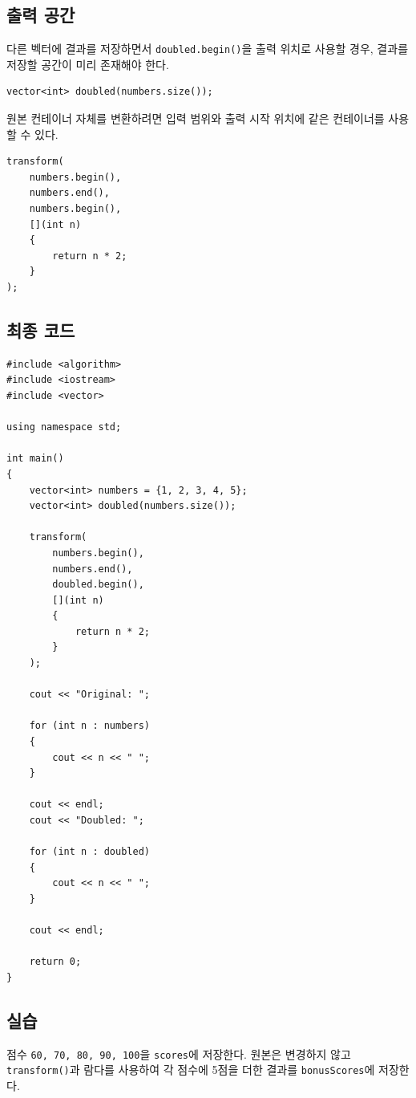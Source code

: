 \documentclass[11pt,a4paper]{article}
\begin{document}
\subsection{출력 공간}
다른 벡터에 결과를 저장하면서 \texttt{doubled.begin()}을 출력 위치로 사용할 경우,
결과를 저장할 공간이 미리 존재해야 한다.

\begin{lstlisting}
vector<int> doubled(numbers.size());
\end{lstlisting}

원본 컨테이너 자체를 변환하려면 입력 범위와 출력 시작 위치에 같은 컨테이너를 사용할 수 있다.

\begin{lstlisting}
transform(
    numbers.begin(),
    numbers.end(),
    numbers.begin(),
    [](int n)
    {
        return n * 2;
    }
);
\end{lstlisting}

\subsection{최종 코드}
\begin{lstlisting}
#include <algorithm>
#include <iostream>
#include <vector>

using namespace std;

int main()
{
    vector<int> numbers = {1, 2, 3, 4, 5};
    vector<int> doubled(numbers.size());

    transform(
        numbers.begin(),
        numbers.end(),
        doubled.begin(),
        [](int n)
        {
            return n * 2;
        }
    );

    cout << "Original: ";

    for (int n : numbers)
    {
        cout << n << " ";
    }

    cout << endl;
    cout << "Doubled: ";

    for (int n : doubled)
    {
        cout << n << " ";
    }

    cout << endl;

    return 0;
}
\end{lstlisting}

\subsection{실습}
\begin{practicebox}
점수 \texttt{60, 70, 80, 90, 100}을 \texttt{scores}에 저장한다.
원본은 변경하지 않고 \texttt{transform()}과 람다를 사용하여 각 점수에 5점을 더한 결과를
\texttt{bonusScores}에 저장한다.
\end{practicebox}
\end{document}

